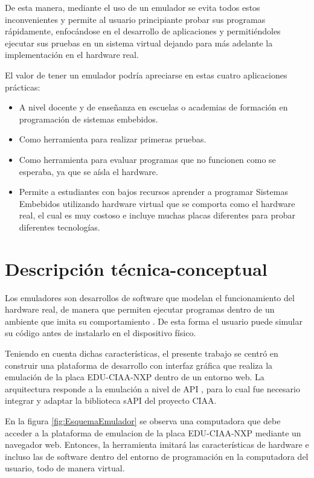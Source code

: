 De esta manera, mediante el uso de un emulador se evita todos estos inconvenientes y permite al usuario principiante probar sus programas rápidamente, enfocándose en el desarrollo de aplicaciones y permitiéndoles ejecutar sus pruebas en un sistema virtual dejando para más adelante la implementación en el hardware real.

El valor de tener un emulador podría apreciarse en estas cuatro aplicaciones prácticas:
\begin{itemize}
	\item A nivel docente y de enseñanza en escuelas o academias de formación en programación de sistemas embebidos.
	\item Como herramienta para realizar primeras pruebas.
	\item Como herramienta para evaluar programas que no funcionen como se esperaba, ya que se aísla el hardware.
	\item Permite a estudiantes con bajos recursos aprender a programar Sistemas Embebidos utilizando hardware virtual que se comporta como el hardware real, el cual es muy costoso e incluye muchas placas diferentes para probar diferentes tecnologías.
\end{itemize}



\section{Descripción técnica-conceptual}

Los emuladores son desarrollos de software que modelan el funcionamiento del hardware real, de manera que permiten ejecutar programas dentro de un ambiente que imita su comportamiento \citep{sanchezqemu}. De esta forma el usuario puede simular su código antes de instalarlo en el dispositivo físico.

Teniendo en cuenta dichas características, el presente trabajo se centró en construir una plataforma de desarrollo con interfaz gráfica que realiza la emulación de la placa EDU-CIAA-NXP dentro de un entorno web. La arquitectura responde a la emulación a nivel de API \citep{API}, para lo cual fue necesario integrar y adaptar la biblioteca sAPI \citep{sAPICIAA} del proyecto CIAA.

En la figura \ref{fig:EsquemaEmulador} se observa una computadora que debe acceder a la plataforma de emulacion de la placa EDU-CIAA-NXP mediante un navegador web. Entonces, la herramienta imitará las características de hardware e incluso las de software dentro del entorno de programación en la computadora del usuario, todo de manera virtual.

